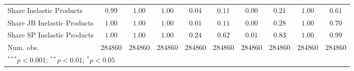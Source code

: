 \begin{tabular}{l c c c c c c c c c}
Share Inelastic Products    & $0.99$        & $1.00$        & $1.00$        & $0.04$        & $0.11$      & $0.00$        & $0.21$        & $1.00$        & $0.61$        \\
Share JB Inelastic Products & $1.00$        & $1.00$        & $1.00$        & $0.01$        & $0.11$      & $0.00$        & $0.28$        & $1.00$        & $0.70$        \\
Share SP Inelastic Products & $1.00$        & $1.00$        & $1.00$        & $0.24$        & $0.62$      & $0.01$        & $0.83$        & $1.00$        & $0.99$        \\
Num. obs.                   & $284860$      & $284860$      & $284860$      & $284860$      & $284860$    & $284860$      & $284860$      & $284860$      & $284860$      \\
\bottomrule
\multicolumn{10}{l}{\scriptsize{$^{***}p<0.001$; $^{**}p<0.01$; $^{*}p<0.05$}}
\end{tabular}
